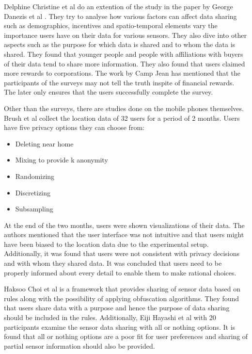 Delphine Christine et al \cite{christin2013s} do an extention of the study in the paper by George Danezis et al \cite{danezis2005much}. They try to analyse how various factors can affect data sharing such as demographics, incentives and spatio-temporal elements vary the importance users have on their data for various sensors. They also dive into other aspects such as the purpose for which data is shared and to whom the data is shared. They found that younger people and people with affiliations with buyers of their data tend to share more information. They also found that users claimed more rewards to corporations. The work by Camp Jean \cite{camp2005state} has mentioned that the participants of the surveys may not tell the truth inspite of financial rewards. The later only ensures that the users successfully complete the survey.

Other than the surveys, there are studies done on the mobile phones themselves. Brush et al \cite{brush2010exploring} collect the location data of 32 users for a period of 2 months. Users have five privacy options they can choose from:

\begin{itemize}
\item Deleting near home
\item Mixing to provide k anonymity
\item Randomizing
\item Discretizing
\item Subsampling
\end{itemize}

At the end of the two months, users were shown visualizations of their data. The authors mentioned that the user interface was not intuitive and that users might have been biased to the location data due to the experimental setup. Additionally, it was found that users were not consistent with privacy decisions and with whom they shared data. It was concluded that users need to be properly informed about every detail to enable them to make rational choices.

Haksoo Choi et al \cite{choi2011sensorsafe} is a framework that provides sharing of sensor data based on rules along with the possibility of applying obfuscation algorithms. They found that users share data with a purpose and hence the purpose of data sharing should be included in the rules. Additionally, Eiji Hayashi et al \cite{hayashi2012goldilocks} with 20 participants examine the sensor data sharing with all or nothing options. It is found that all or nothing options are a poor fit for user preferences and sharing of partial sensor information should also be provided.

